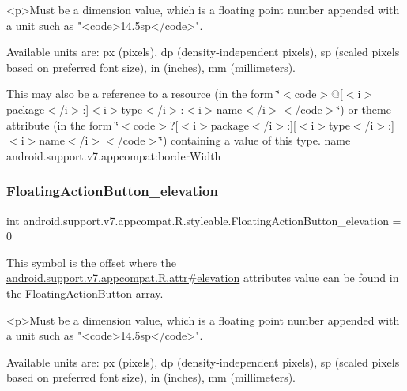 \begin{DoxyVerb}      <p>Must be a dimension value, which is a floating point number appended with a unit such as "<code>14.5sp</code>".
\end{DoxyVerb}
 Available units are\+: px (pixels), dp (density-\/independent pixels), sp (scaled pixels based on preferred font size), in (inches), mm (millimeters). 

This may also be a reference to a resource (in the form \char`\"{}$<$code$>$@\mbox{[}$<$i$>$package$<$/i$>$\+:\mbox{]}$<$i$>$type$<$/i$>$\+:$<$i$>$name$<$/i$>$$<$/code$>$\char`\"{}) or theme attribute (in the form \char`\"{}$<$code$>$?\mbox{[}$<$i$>$package$<$/i$>$\+:\mbox{]}\mbox{[}$<$i$>$type$<$/i$>$\+:\mbox{]}$<$i$>$name$<$/i$>$$<$/code$>$\char`\"{}) containing a value of this type.  name android.\+support.\+v7.\+appcompat\+:border\+Width \mbox{\label{classandroid_1_1support_1_1v7_1_1appcompat_1_1R_1_1styleable_a11aec0e64f52fb4ec43da30d5c89dc2f}} 
\subsubsection{\texorpdfstring{Floating\+Action\+Button\+\_\+elevation}{FloatingActionButton\_elevation}}
{\footnotesize\ttfamily int android.\+support.\+v7.\+appcompat.\+R.\+styleable.\+Floating\+Action\+Button\+\_\+elevation = 0\hspace{0.3cm}{\ttfamily [static]}}

This symbol is the offset where the \hyperlink{classandroid_1_1support_1_1v7_1_1appcompat_1_1R_1_1attr_a4ad8a7d23ae4731f5836683e9cb7f790}{android.\+support.\+v7.\+appcompat.\+R.\+attr\#elevation} attribute\textquotesingle{}s value can be found in the \hyperlink{classandroid_1_1support_1_1v7_1_1appcompat_1_1R_1_1styleable_a9bfca89352160169125a89277e9fb2a1}{Floating\+Action\+Button} array.

\begin{DoxyVerb}      <p>Must be a dimension value, which is a floating point number appended with a unit such as "<code>14.5sp</code>".
\end{DoxyVerb}
 Available units are\+: px (pixels), dp (density-\/independent pixels), sp (scaled pixels based on preferred font size), in (inches), mm (millimeters). 

